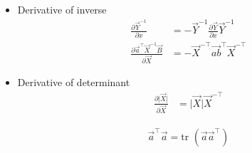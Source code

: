 \documentclass[12pt,twoside]{article}
\begin{document}
\begin{itemize}
\item Derivative of inverse
	\begin{align*}
		\frac{\partial \vec{Y}^{-1}}{\partial x} &= -\vec{Y}^{-1}\frac{\partial \vec{Y}}{\partial x}\vec{Y}^{-1}\\
		\frac{\partial \vec{a}^\top\vec{X}^{-1}\vec{B}}{\partial \vec{X}} &= -\vec{X}^{-\top}\vec{ab}^\top\vec{X}^{-\top}
	\end{align*}

\item Derivative of determinant
	\begin{align*}
		\frac{\partial \vert \vec{X}\vert}{\partial \vec{X}} & = \vert \vec{X}\vert \vec{X}^{-\top}
	\end{align*}

	\begin{align*}
		\vec{a}^\top \vec{a} = \text{tr }(\vec{a}\vec{a}^\top)
	\end{align*}

\end{itemize}
\end{document}
